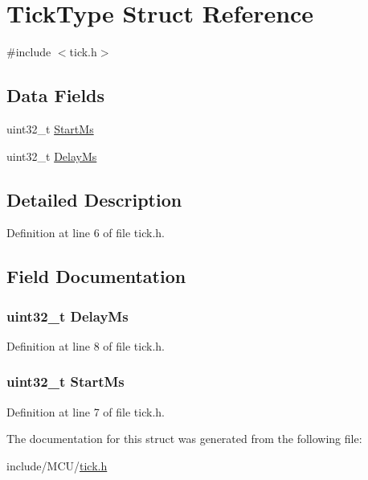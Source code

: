 \hypertarget{struct_tick_type}{}\section{Tick\+Type Struct Reference}
\label{struct_tick_type}


{\ttfamily \#include $<$tick.\+h$>$}

\subsection*{Data Fields}
\begin{DoxyCompactItemize}
\item 
uint32\+\_\+t \hyperlink{struct_tick_type_aeaab8263ab7e87aedcfc03deb18d2a97}{Start\+Ms}
\item 
uint32\+\_\+t \hyperlink{struct_tick_type_ae36f6fdb594fce60714a15611d8cfffa}{Delay\+Ms}
\end{DoxyCompactItemize}


\subsection{Detailed Description}


Definition at line 6 of file tick.\+h.



\subsection{Field Documentation}
\subsubsection[{\texorpdfstring{Delay\+Ms}{DelayMs}}]{\setlength{\rightskip}{0pt plus 5cm}uint32\+\_\+t Delay\+Ms}\hypertarget{struct_tick_type_ae36f6fdb594fce60714a15611d8cfffa}{}\label{struct_tick_type_ae36f6fdb594fce60714a15611d8cfffa}


Definition at line 8 of file tick.\+h.

\subsubsection[{\texorpdfstring{Start\+Ms}{StartMs}}]{\setlength{\rightskip}{0pt plus 5cm}uint32\+\_\+t Start\+Ms}\hypertarget{struct_tick_type_aeaab8263ab7e87aedcfc03deb18d2a97}{}\label{struct_tick_type_aeaab8263ab7e87aedcfc03deb18d2a97}


Definition at line 7 of file tick.\+h.



The documentation for this struct was generated from the following file\+:\begin{DoxyCompactItemize}
\item 
include/\+M\+C\+U/\hyperlink{tick_8h}{tick.\+h}\end{DoxyCompactItemize}
